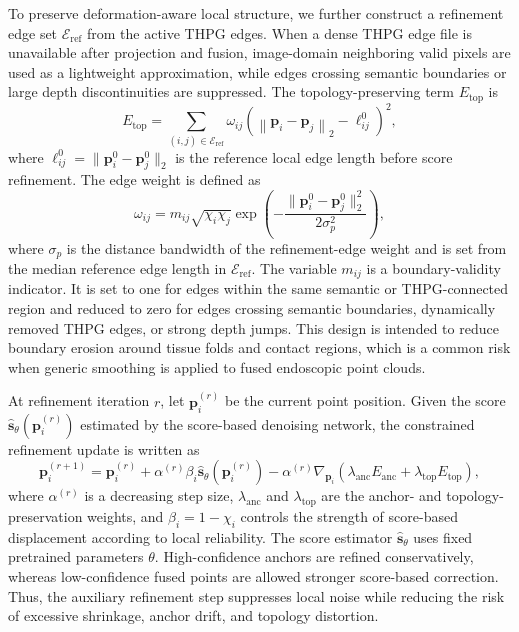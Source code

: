 \documentclass[pdflatex,sn-mathphys-num]{sn-jnl}
\begin{document}
To preserve deformation-aware local structure, we further construct a refinement edge set \(\mathcal{E}_{\mathrm{ref}}\) from the active THPG edges. When a dense THPG edge file is unavailable after projection and fusion, image-domain neighboring valid pixels are used as a lightweight approximation, while edges crossing semantic boundaries or large depth discontinuities are suppressed. The topology-preserving term $E_{\mathrm{top}}$ is
\begin{equation}
E_{\mathrm{top}} = \sum_{(i,j)\in\mathcal{E}_{\mathrm{ref}}} \omega_{ij}
\left(\left\lVert \mathbf{p}_{i}-\mathbf{p}_{j}\right\rVert_2 - \ell_{ij}^{0}\right)^2,
\label{eq:refine-topology}
\end{equation}
where \(\ell_{ij}^{0}=\lVert\mathbf{p}_{i}^{0}-\mathbf{p}_{j}^{0}\rVert_2\) is the reference local edge length before score refinement. The edge weight is defined as
\begin{equation}
\omega_{ij}=m_{ij}\sqrt{\chi_i \chi_j}\exp\!\left(-\frac{\lVert\mathbf{p}_{i}^{0}-\mathbf{p}_{j}^{0}\rVert_2^2}{2\sigma_{p}^{2}}\right),
\label{eq:refine-weight}
\end{equation}
where \(\sigma_p\) is the distance bandwidth of the refinement-edge weight and is set from the median reference edge length in \(\mathcal{E}_{\mathrm{ref}}\). The variable \(m_{ij}\) is a boundary-validity indicator. It is set to one for edges within the same semantic or THPG-connected region and reduced to zero for edges crossing semantic boundaries, dynamically removed THPG edges, or strong depth jumps. This design is intended to reduce boundary erosion around tissue folds and contact regions, which is a common risk when generic smoothing is applied to fused endoscopic point clouds.

At refinement iteration \(r\), let \(\mathbf{p}_{i}^{(r)}\) be the current point position. Given the score \(\hat{\mathbf{s}}_{\theta}(\mathbf{p}_{i}^{(r)})\) estimated by the score-based denoising network, the constrained refinement update is written as
\begin{equation}
\mathbf{p}_{i}^{(r+1)} = \mathbf{p}_{i}^{(r)}
+ \alpha^{(r)}\beta_i\hat{\mathbf{s}}_{\theta}\!\left(\mathbf{p}_{i}^{(r)}\right)
- \alpha^{(r)}\nabla_{\mathbf{p}_{i}}
\left(\lambda_{\mathrm{anc}}E_{\mathrm{anc}} + \lambda_{\mathrm{top}}E_{\mathrm{top}}\right),
\label{eq:refine-update}
\end{equation}
where \(\alpha^{(r)}\) is a decreasing step size, \(\lambda_{\mathrm{anc}}\) and \(\lambda_{\mathrm{top}}\) are the anchor- and topology-preservation weights, and \(\beta_i=1-\chi_i\) controls the strength of score-based displacement according to local reliability. The score estimator \(\hat{\mathbf{s}}_{\theta}\) uses fixed pretrained parameters \(\theta\). High-confidence anchors are refined conservatively, whereas low-confidence fused points are allowed stronger score-based correction. Thus, the auxiliary refinement step suppresses local noise while reducing the risk of excessive shrinkage, anchor drift, and topology distortion.
\end{document}
